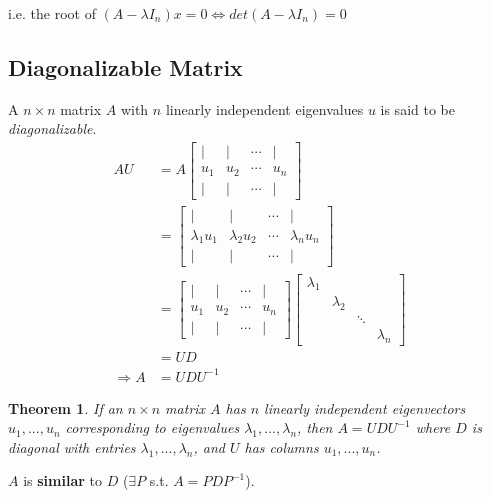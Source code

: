 \documentclass[11pt,a4paper]{article}
\newtheorem{theorem}{Theorem}
\begin{document}
i.e. the root of $(A-\lambda I_n)x=0 \Leftrightarrow det(A-\lambda I_n)=0$





\subsection{Diagonalizable Matrix}
A $n\times n$ matrix $A$ with $n$ linearly independent eigenvalues $u$ is said to be \textit{diagonalizable}.
\begin{equation}
    \begin{aligned}
        AU&=A\begin{bmatrix}
            |&|&\cdots&|\\
            u_1&u_2&\cdots&u_n\\
            |&|&\cdots&|
        \end{bmatrix}\\
        &=\begin{bmatrix}
            |&|&\cdots&|\\
            \lambda_1u_1&\lambda_2u_2&\cdots&\lambda_nu_n\\
            |&|&\cdots&|
        \end{bmatrix}\\
        &=\begin{bmatrix}
            |&|&\cdots&|\\
            u_1&u_2&\cdots&u_n\\
            |&|&\cdots&|
        \end{bmatrix}\begin{bmatrix}
            \lambda_1&&&\\
            &\lambda_2&&\\
            &&\ddots&\\
            &&&\lambda_n
        \end{bmatrix}\\
        &=UD\\
        \Rightarrow	A&=UDU^{-1}
    \end{aligned}
    \nonumber
\end{equation}

\begin{theorem}
    If an $n\times n$ matrix $A$ has $n$ linearly independent eigenvectors $u_1,...,u_n$ corresponding to eigenvalues $\lambda_1,...,\lambda_n$, then $A = UDU^{−1}$ where $D$ is diagonal with entries $\lambda_1,...,\lambda_n$, and $U$ has columns $u_1,...,u_n$.
\end{theorem}
$A$ is \textbf{similar} to $D$ ($\exists P$ s.t. $A=PDP^{-1}$).
\end{document}

